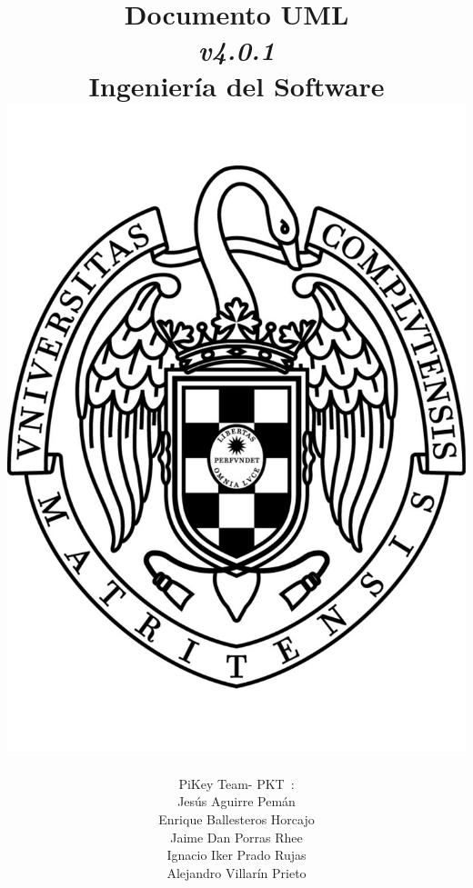 \documentclass[spanish,a4paper,11pt, twoside]{report}	%
\newcommand*{\PKT}{\hbox{P}\kern-2.5pt\lower3.5pt\hbox{\small{K}}\kern-2.8pt\hbox{T}\kern-2pt}	%
\begin{document}
\title{\textbf{\huge{ Documento UML}} \\ 
	\textit{v4.0.1} \\	\vspace{0.1cm}
	\Large{Ingeniería del Software} \\
	\includegraphics[scale=0.3]{ucm.pdf}}
\author{ {\Large{PiKey Team-}} \PKT \ : \vspace{0.2cm} \\
	Jesús Aguirre Pemán \\
	 Enrique Ballesteros Horcajo \\
	 Jaime Dan Porras Rhee \\
	 Ignacio Iker Prado Rujas \\
	 Alejandro Villarín Prieto }
\date{\Today}
\maketitle
\end{document}
